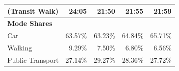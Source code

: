 \begin{table}[ht]
\begin{tabular}{@{}lrrrr@{}}
(Transit Walk)                     & 24:05                        & 21:50                        & 21:55                        & 21:59                        \\\midrule
\textbf{Mode Shares}               & \multicolumn{1}{l}{}         & \multicolumn{1}{l}{}         & \multicolumn{1}{l}{}         & \multicolumn{1}{l}{}         \\
Car                                & 63.57\%                      & 63.23\%                      & 64.84\%                      & 65.71\%                      \\
Walking                            & 9.29\%                       & 7.50\%                       & 6.80\%                       & 6.56\%                       \\
Public Transport                   & 27.14\%                      & 29.27\%                      & 28.36\%                      & 27.72\%                      \\ \bottomrule
\end{tabular}
\end{table}

